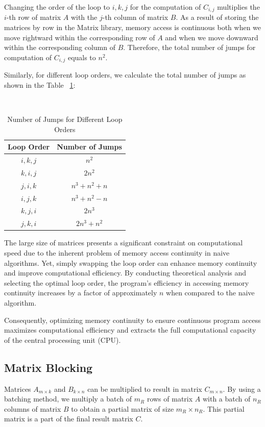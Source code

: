 \documentclass[conference]{IEEEtran}
\begin{document}
	Changing the order of the loop to $i,k,j$ for the computation of $C_{i,j}$ multiplies the $i$-th row of matrix $A$ with the $j$-th column of matrix $B$. As a result of storing the matrices by row in the Matrix library, memory access is continuous both when we move rightward within the corresponding row of $A$ and when we move downward within the corresponding column of $B$. Therefore, the total number of jumps for computation of $C_{i,j}$ equals to $n^2$.
	
	Similarly, for different loop orders, we calculate the total number of jumps as shown in the Table ~\ref{tab:loopjumps}:
	
	\begin{table}[htbp]
		\caption{Number of Jumps for Different Loop Orders}
		\centering\
		\setlength\extrarowheight{2pt}
		\label{tab:loopjumps}
		\begin{tabular}{|c|c|}
			\hline
			Loop Order & Number of Jumps \\ \hline
			$i,k,j$ & $n^2$ \\ \hline
			$k,i,j$ & $2n^2$ \\ \hline
			$j,i,k$ & $n^3 + n^2 + n$ \\ \hline
			$i,j,k$ & $n^3 + n^2 - n$ \\ \hline
			$k,j,i$ & $2n^3$ \\ \hline
			$j,k,i$ & $2n^3 + n^2$ \\ \hline
		\end{tabular}
	\end{table}
	
	The large size of matrices presents a significant constraint on computational speed due to the inherent problem of memory access continuity in naive algorithms. Yet, simply swapping the loop order can enhance memory continuity and improve computational efficiency.
	By conducting theoretical analysis and selecting the optimal loop order, the program's efficiency in accessing memory continuity increases by a factor of approximately $n$ when compared to the naive algorithm.
	
	Consequently, optimizing memory continuity to ensure continuous program access maximizes computational efficiency and extracts the full computational capacity of the central processing unit (CPU).
	\subsection{Matrix Blocking}
	Matrices $A_{m \times k}$ and $B_{k \times n}$ can be multiplied to result in matrix $C_{m \times n}$. By using a batching method, we multiply a batch of $m_R$ rows of matrix $A$ with a batch of $n_R$ columns of matrix $B$ to obtain a partial matrix of size $m_R \times n_R$. This partial matrix is a part of the final result matrix $C$.
	
\end{document}
